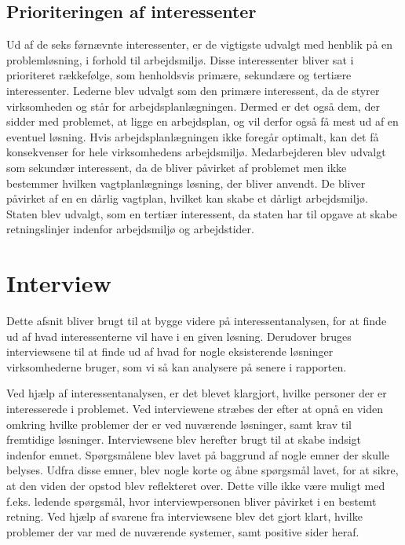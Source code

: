 \subsection{Prioriteringen af interessenter}
Ud af de seks førnævnte interessenter, er de vigtigste udvalgt med henblik på en problemløsning, i forhold til arbejdsmiljø. Disse interessenter bliver sat i prioriteret rækkefølge, som henholdsvis primære, sekundære og tertiære interessenter. Lederne blev udvalgt som den primære interessent, da de styrer virksomheden og står for arbejdsplanlægningen. Dermed er det også dem, der sidder med problemet, at ligge en arbejdsplan, og vil derfor også få mest ud af en eventuel løsning. Hvis arbejdsplanlægningen ikke foregår optimalt, kan det få konsekvenser for hele virksomhedens arbejdsmiljø. Medarbejderen blev udvalgt som sekundær interessent, da de bliver påvirket af problemet men ikke bestemmer hvilken vagtplanlægnings løsning, der bliver anvendt. De bliver påvirket af en en dårlig vagtplan, hvilket kan skabe et dårligt arbejdsmiljø. Staten blev udvalgt, som en tertiær interessent, da staten har til opgave at skabe retningslinjer indenfor arbejdsmiljø og arbejdstider.


\section{Interview}
Dette afsnit bliver brugt til at bygge videre på interessentanalysen, for at finde ud af hvad interessenterne vil have i en given løsning. Derudover bruges interviewsene til at finde ud af hvad for nogle eksisterende løsninger virksomhederne bruger, som vi så kan analysere på senere i rapporten. 

Ved hjælp af interessentanalysen, er det blevet klargjort, hvilke personer der er interesserede i problemet. Ved interviewene stræbes der efter at opnå en viden omkring hvilke problemer der er ved nuværende løsninger, samt krav til fremtidige løsninger. Interviewsene blev herefter brugt til at skabe indsigt indenfor emnet. Spørgsmålene blev lavet på baggrund af nogle emner der skulle belyses. Udfra disse emner, blev nogle korte og åbne spørgsmål lavet, for at sikre, at den viden der opstod blev reflekteret over. Dette ville ikke være muligt med f.eks. ledende spørgsmål, hvor interviewpersonen bliver påvirket i en bestemt retning. Ved hjælp af svarene fra interviewsene blev det gjort klart, hvilke problemer der var med de nuværende systemer, samt positive sider heraf. %

